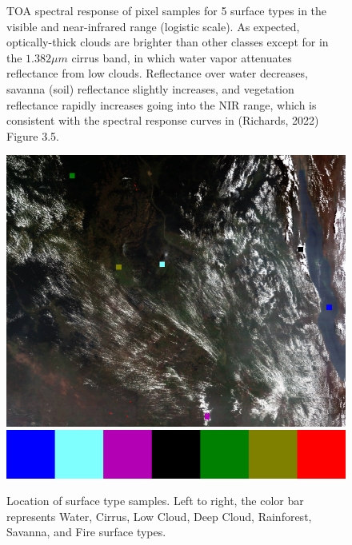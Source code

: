 \documentclass[12pt]{article}
\begin{document}
\begin{figure}[h!]
    \centering

    \begin{center}
    \end{center}

    \caption{TOA spectral response of pixel samples for 5 surface types in the visible and near-infrared range (logistic scale). As expected, optically-thick clouds are brighter than other classes except for in the $1.382\mu m$ cirrus band, in which water vapor attenuates reflectance from low clouds. Reflectance over water decreases, savanna (soil) reflectance slightly increases, and vegetation reflectance rapidly increases going into the NIR range, which is consistent with the spectral response curves in (Richards, 2022) Figure 3.5.}
    \label{p5_ref_dist}
\end{figure}

\begin{figure}[h!]
    \centering
    \includegraphics[width=.8\linewidth]{figures/rgb_samples_tc.png}
    \includegraphics[width=.3\linewidth]{figures/rgb_sample_cbar.png}

    \caption{Location of surface type samples. Left to right, the color bar represents Water, Cirrus, Low Cloud, Deep Cloud, Rainforest, Savanna, and Fire surface types.}
    \label{p5_ref_samples}
\end{figure}
\end{document}
